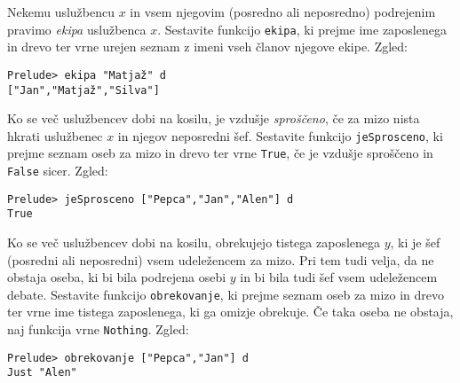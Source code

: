 \documentclass[arhiv]{../izpit}
\begin{document}
\podnaloga[10 točk]
Nekemu uslužbencu $x$ in vsem njegovim (posredno ali neposredno) podrejenim pravimo \emph{ekipa} uslužbenca $x$.
Sestavite funkcijo
\verb+ekipa+, ki prejme ime zaposlenega in drevo ter vrne urejen seznam z imeni vseh članov njegove ekipe. Zgled:
\begin{verbatim}Prelude> ekipa "Matjaž" d
["Jan","Matjaž","Silva"]
\end{verbatim}

\podnaloga[10 točk]
Ko se več uslužbencev dobi na kosilu, je vzdušje \emph{sproščeno}, če za mizo nista hkrati uslužbenec $x$ in njegov
neposredni šef. Sestavite funkcijo \verb+jeSprosceno+,
ki prejme seznam oseb za mizo in drevo ter vrne \verb+True+, če je vzdušje sproščeno in \verb+False+ sicer. Zgled:
\begin{verbatim}Prelude> jeSprosceno ["Pepca","Jan","Alen"] d
True
\end{verbatim}

\podnaloga[10 točk]
Ko se več uslužbencev dobi na kosilu, obrekujejo tistega zaposlenega $y$, ki je šef (posredni ali neposredni) vsem udeležencem
za mizo. Pri tem tudi velja, da ne obstaja oseba, ki bi bila podrejena osebi $y$ in bi bila tudi šef vsem udeležencem debate.
Sestavite funkcijo \verb+obrekovanje+,
ki prejme seznam oseb za mizo in drevo ter vrne ime tistega zaposlenega, ki ga omizje obrekuje. Če taka oseba ne obstaja, naj
funkcija vrne \verb|Nothing|. Zgled:
\begin{verbatim}Prelude> obrekovanje ["Pepca","Jan"] d
Just "Alen"
\end{verbatim}

 
\end{document}

